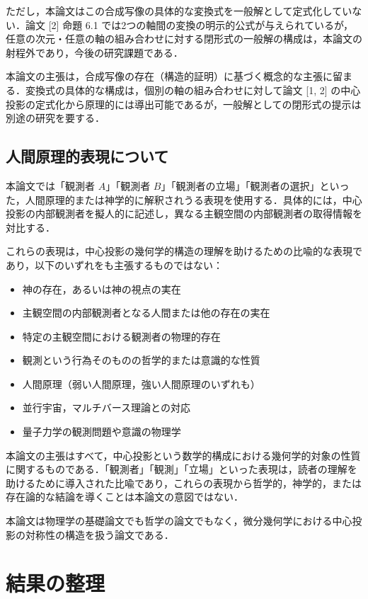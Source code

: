 \documentclass[a4paper,11pt]{ltjsarticle}
\theoremstyle{definition}
\begin{document}
ただし，本論文はこの合成写像の具体的な変換式を一般解として定式化していない．論文 {[2]} 命題 6.1 では2つの軸間の変換の明示的公式が与えられているが，任意の次元・任意の軸の組み合わせに対する閉形式の一般解の構成は，本論文の射程外であり，今後の研究課題である．

本論文の主張は，合成写像の存在（構造的証明）に基づく概念的な主張に留まる．変換式の具体的な構成は，個別の軸の組み合わせに対して論文 {[1, 2]} の中心投影の定式化から原理的には導出可能であるが，一般解としての閉形式の提示は別途の研究を要する．

\subsection{人間原理的表現について}

本論文では「観測者 \(A\)」「観測者 \(B\)」「観測者の立場」「観測者の選択」といった，人間原理的または神学的に解釈されうる表現を使用する．具体的には，中心投影の内部観測者を擬人的に記述し，異なる主観空間の内部観測者の取得情報を対比する．

これらの表現は，中心投影の幾何学的構造の理解を助けるための比喩的な表現であり，以下のいずれをも主張するものではない：

\begin{itemize}
\item 神の存在，あるいは神の視点の実在
\item 主観空間の内部観測者となる人間または他の存在の実在
\item 特定の主観空間における観測者の物理的存在
\item 観測という行為そのものの哲学的または意識的な性質
\item 人間原理（弱い人間原理，強い人間原理のいずれも）
\item 並行宇宙，マルチバース理論との対応
\item 量子力学の観測問題や意識の物理学
\end{itemize}

本論文の主張はすべて，中心投影という数学的構成における幾何学的対象の性質に関するものである．「観測者」「観測」「立場」といった表現は，読者の理解を助けるために導入された比喩であり，これらの表現から哲学的，神学的，または存在論的な結論を導くことは本論文の意図ではない．

本論文は物理学の基礎論文でも哲学の論文でもなく，微分幾何学における中心投影の対称性の構造を扱う論文である．

\section{結果の整理}
\end{document}
